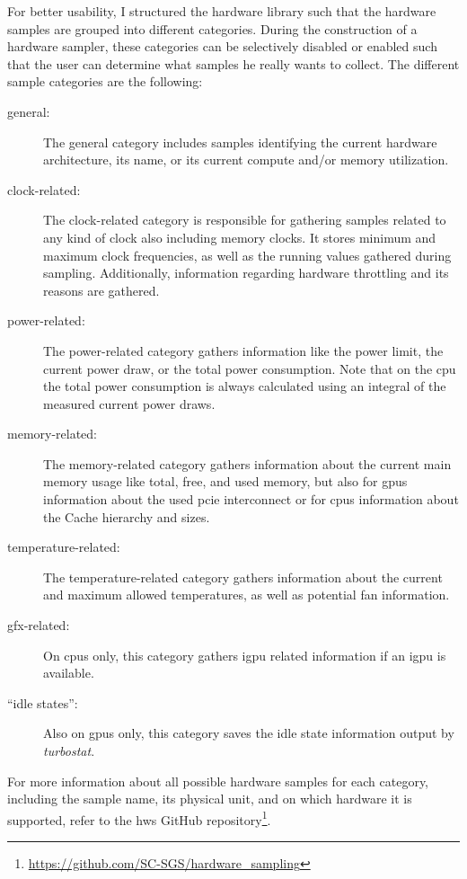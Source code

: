 For better usability, I structured the hardware library such that the hardware samples are grouped into different categories. 
During the construction of a hardware sampler, these categories can be selectively disabled or enabled such that the user can determine what samples he really wants to collect.
The different sample categories are the following:
\begin{description}
    \item[general:]%
    The general category includes samples identifying the current hardware architecture, its name, or its current compute and/or memory utilization.
    \item[clock-related:]%
    The clock-related category is responsible for gathering samples related to any kind of clock also including memory clocks. 
    It stores minimum and maximum clock frequencies, as well as the running values gathered during sampling. 
    Additionally, information regarding hardware throttling and its reasons are gathered.
    \item[power-related:]%
    The power-related category gathers information like the power limit, the current power draw, or the total power consumption. 
    Note that on the \gls{cpu} the total power consumption is always calculated using an integral of the measured current power draws. 
    \item[memory-related:]%
    The memory-related category gathers information about the current main memory usage like total, free, and used memory, but also for \glspl{gpu} information about the used \gls{pcie} interconnect or for \glspl{cpu} information about the Cache hierarchy and sizes. 
    \item[temperature-related:] The temperature-related category gathers information about the current and maximum allowed temperatures, as well as potential fan information. 
    \item[gfx-related:] On \glspl{cpu} only, this category gathers i\gls{gpu} related information if an i\gls{gpu} is available. 
    \item[\enquote{idle states}:] Also on \glspl{gpu} only, this category saves the idle state information output by \textit{turbostat}.
\end{description}
For more information about all possible hardware samples for each category, including the sample name, its physical unit, and on which hardware it is supported, refer to the hws GitHub repository\footnote{\url{https://github.com/SC-SGS/hardware_sampling}}.

